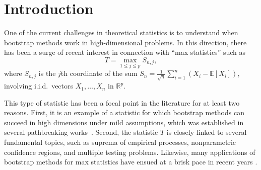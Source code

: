 \documentclass[aos,preprint]{imsart}
\numberwithin{equation}{section}
\theoremstyle{plain}
\newcommand{\R}{\mathbb{R}}
\newcommand{\E}{\mathbb{E}}
\newcommand{\1}{{\bf{1}}}
\newcommand{\0}{\mathbf{0}}
\def\cp{\citep}
\begin{document}
\begin{frontmatter}
\begin{abstract}
The main purpose of this paper is to demonstrate that improvement in rate is possible when extra model structure is available. Specifically, we show that if the coordinate-wise variances of the observations exhibit decay, then a nearly $n^{-1/2}$ rate can be achieved, \emph{independent of $p$}. Furthermore, a surprising aspect of this dimension-free rate is that it holds even when the decay is \emph{very weak}. Lastly, we provide examples showing how these ideas can be applied to inference problems dealing with functional and multinomial data.

\end{abstract}

\begin{keyword}[class=MSC]
\end{keyword}

\begin{keyword}
\end{keyword}

\end{frontmatter}

\section{Introduction}
One of the current challenges in theoretical statistics is to understand when bootstrap methods work in high-dimensional problems. In this direction, there has been a surge of recent interest in connection with ``max statistics'' such as
$$T=\max_{1\leq j\leq p} S_{n,j},$$
where $S_{n,j}$ is the $j$th coordinate of the sum \mbox{$S_n=\frac{1}{\sqrt n}\sum_{i=1}^n (X_i-\E[X_i])$,} involving i.i.d.~vectors $X_1,\dots,X_n$ in $\R^p$.

This type of statistic has been a focal point in the literature for at least two reasons. First, it is an example of a statistic for which bootstrap methods can succeed in high dimensions under mild assumptions, which was established 
in several pathbreaking works~\cp{ArlotI:2010,ArlotII:2010,CCK:2013,CCK:AOP}. Second, the statistic $T$ is closely linked to several fundamental topics, such as suprema of empirical processes, nonparametric confidence regions, and multiple testing problems. Likewise, many applications of bootstrap methods for max statistics have ensued at a brisk pace in recent years 
\cp[see, e.g.,][]{CCKAnti:2014,Wasserman:2014,ChenRidges:2015,Yao:2017,ChengJASA:2017,Dezeure:2017,ChenUstat:2018,fan:18,Belloni:2018}.
\end{document}
